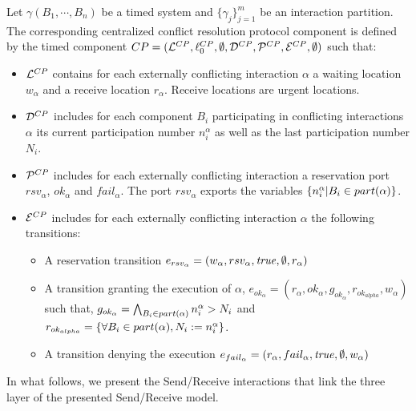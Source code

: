 \begin{definition}
  Let $\gamma(B_1,\cdots,B_n)$ be a timed system and $\{\gamma_j\}^m_{j=1}$ be an interaction
  partition. The corresponding centralized conflict resolution protocol component is defined
  by the timed component $CP=(\mathcal{L}^{CP},\ell_0^{CP},\emptyset,\mathcal{D}^{CP},\mathcal{P}^{CP},\mathcal{E}^{CP}
  ,\emptyset)$ such that:
  \begin{itemize}
    \item $\mathcal{L}^{CP}$ contains for each externally conflicting interaction $\alpha$ a waiting
      location $w_{\alpha}$ and a receive location $r_{\alpha}$. Receive locations are 
      urgent locations.
    \item $\mathcal{D}^{CP}$ includes for each component $B_i$ participating in conflicting 
      interactions $\alpha$ its current participation number $n_i^{\alpha}$ as well as the last 
      participation number $N_i$.
    \item $\mathcal{P}^{CP}$ includes for each externally conflicting interaction a reservation port
      $rsv_{\alpha}$, $ok_{\alpha}$ and $fail_{\alpha}$. The port $rsv_{\alpha}$ exports
      the variables $\{n_i^{\alpha}|B_i\in part(\alpha)\}$.
    \item $\mathcal{E}^{CP}$ includes for each externally conflicting interaction $\alpha$ the 
      following transitions:
      \begin{itemize}
        \item A reservation transition 
          $e_{rsv_{\alpha}}=(w_{\alpha},rsv_{\alpha},\textnormal{\textit{true}},\emptyset,r_{\alpha})$ 
        \item A transition granting the execution of $\alpha$, 
          $e_{ok_{\alpha}}=(r_{\alpha},ok_{\alpha},g_{ok_{\alpha}},r_{ok_{alpha}},w_{\alpha})$ 
          such that, $g_{ok_{\alpha}}=\bigwedge_{B_i\in part(\alpha)} n_i^{\alpha}>N_i$ and
          $r_{ok_{alpha}}=\{\forall B_i\in part(\alpha), N_i:=n_i^{\alpha}\}$.
        \item A transition denying the execution 
          $e_{fail_{\alpha}}=(r_{\alpha},fail_{\alpha},\textnormal{\textit{true}},\emptyset,w_{\alpha})$
      \end{itemize}
  \end{itemize}
\end{definition}

In what follows, we present the Send/Receive interactions that link the three layer of the 
presented Send/Receive model.


